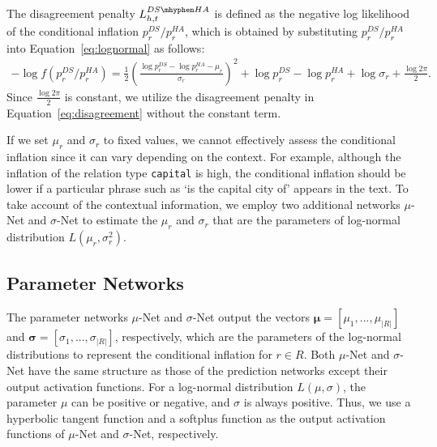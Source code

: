 \documentclass[11pt]{article}
\newcommand{\munet}{$\mu$-Net\xspace}
\newcommand{\sigmanet}{$\sigma$-Net\xspace}
\newcommand{\lognormal}[2]{{L}(#1, #2)}
\newcommand{\relationt}[1]{\texttt{#1}}
\newcommand{\vect}[1]{\boldsymbol{\mathbf{#1}}}
\begin{document}
The disagreement penalty $L_{h,t}^{DS\mhyphen HA}$ is defined as the negative log likelihood of the conditional inflation ${p^{DS}_{r}}/{p^{HA}_{r}}$, which is obtained by substituting ${p^{DS}_{r}}/{p^{HA}_{r}}$ into Equation~\eqref{eq:lognormal} as follows:
\begin{equation}
\label{eq:disagreement}
\begin{aligned}
-\log{f\left({p^{DS}_{r}}/{p^{HA}_{r}}\right)} = \frac{1}{2}\left(\frac{\log{p^{DS}_{r}} - \log{p^{HA}_{r}}-\mu_r}{\sigma_r}\right)^2 +\log{p^{DS}_{r}} - \log{p^{HA}_{r}}+\log{\sigma_r} + \frac{\log{2\pi}}{2}.
\end{aligned}
\end{equation}
Since $\frac{\log{2\pi}}{2}$ is constant, we utilize the disagreement penalty in Equation~\eqref{eq:disagreement} without the constant term.


If we set $\mu_r$ and $\sigma_r$ to fixed values, we cannot effectively assess the conditional inflation since it can vary depending on the context.
For example, although the inflation of the relation type \relationt{capital} is high, the conditional inflation should be lower if a particular phrase such as `is the capital city of' appears in the text.
To take account of the contextual information,
we employ two additional networks \munet and \sigmanet to estimate the $\mu_r$ and $\sigma_r$ that are the parameters of log-normal distribution $\lognormal{\mu_r}{\sigma_r^2}$.



\subsection{Parameter Networks}
The parameter networks \munet and \sigmanet output the vectors $\vect{\mu}=[\mu_1,...,\mu_{|R|}]$ and $\vect{\sigma}=[\sigma_1,...,\sigma_{|R|}]$, respectively, which are
the parameters of the log-normal distributions to represent the conditional inflation for $r\in R$.
Both \munet and \sigmanet have the same structure as those of the prediction networks except their output activation functions.
For a log-normal distribution $\lognormal{\mu}{\sigma}$, the parameter $\mu$ can be positive or negative, and $\sigma$ is always positive.
Thus, we use a hyperbolic tangent function and a softplus function \cite{dugas2001incorporating} as the output activation functions of \munet and \sigmanet, respectively.
\end{document}
